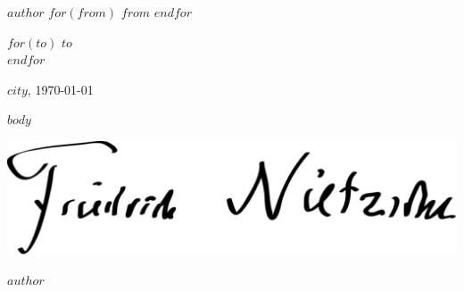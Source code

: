 \documentclass[$fontsize$, a4paper]{article}
\begin{document}
\small
\textsc{$author$}
$for(from)$
\textbullet{} \textsc{$from$}
$endfor$

\vspace{1em}

\normalsize \sffamily
$for(to)$
$to$\\
$endfor$

\vspace{3em}

\rmfamily
\begin{flushright}
  $city$, \today
\end{flushright}

\vspace{1em}

$body$

\begin{FlushRight}
  \includegraphics[height=5.5\baselineskip]{signature.pdf} \par
  $author$
\end{FlushRight}
\end{document}
